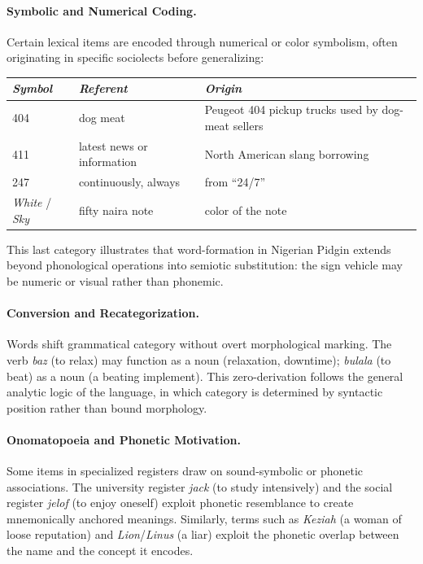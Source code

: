 \documentclass[12pt]{article}
\begin{document}
\paragraph{Symbolic and Numerical Coding.}
Certain lexical items are encoded through numerical or color symbolism, often originating in specific sociolects before generalizing:

\begin{center}
\begin{tabular}{lll}
\textit{Symbol} & \textit{Referent} & \textit{Origin} \\
\hline
404 & dog meat & Peugeot 404 pickup trucks used by dog-meat sellers \\
411 & latest news or information & North American slang borrowing \\
247 & continuously, always & from ``24/7'' \\
\textit{White} / \textit{Sky} & fifty naira note & color of the note \\
\end{tabular}
\end{center}

This last category illustrates that word-formation in Nigerian Pidgin extends beyond phonological operations into semiotic substitution: the sign vehicle may be numeric or visual rather than phonemic.

\paragraph{Conversion and Recategorization.}
Words shift grammatical category without overt morphological marking. The verb \textit{baz} (to relax) may function as a noun (relaxation, downtime); \textit{bulala} (to beat) as a noun (a beating implement). This zero-derivation follows the general analytic logic of the language, in which category is determined by syntactic position rather than bound morphology.

\paragraph{Onomatopoeia and Phonetic Motivation.}
Some items in specialized registers draw on sound-symbolic or phonetic associations. The university register \textit{jack} (to study intensively) and the social register \textit{jelof} (to enjoy oneself) exploit phonetic resemblance to create mnemonically anchored meanings. Similarly, terms such as \textit{Keziah} (a woman of loose reputation) and \textit{Lion}/\textit{Linus} (a liar) exploit the phonetic overlap between the name and the concept it encodes.
\end{document}
